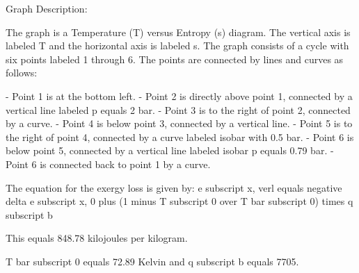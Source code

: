 Graph Description:

The graph is a Temperature (T) versus Entropy (s) diagram. The vertical axis is labeled T and the horizontal axis is labeled s. The graph consists of a cycle with six points labeled 1 through 6. The points are connected by lines and curves as follows:

- Point 1 is at the bottom left.
- Point 2 is directly above point 1, connected by a vertical line labeled p equals 2 bar.
- Point 3 is to the right of point 2, connected by a curve.
- Point 4 is below point 3, connected by a vertical line.
- Point 5 is to the right of point 4, connected by a curve labeled isobar with 0.5 bar.
- Point 6 is below point 5, connected by a vertical line labeled isobar p equals 0.79 bar.
- Point 6 is connected back to point 1 by a curve.

The equation for the exergy loss is given by:
e subscript x, verl equals negative delta e subscript x, 0 plus (1 minus T subscript 0 over T bar subscript 0) times q subscript b

This equals 848.78 kilojoules per kilogram.

T bar subscript 0 equals 72.89 Kelvin and q subscript b equals 7705.